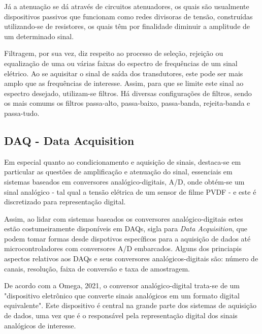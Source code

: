 \documentclass[
	12pt,				
	oneside,			
	a4paper,			
	english,			
	brazil,			
	]{abntex2ppgsi}
\begin{document}
Já a atenuação se dá através de circuitos atenuadores, os quais são usualmente dispositivos passivos que funcionam como redes divisoras de tensão, construídas utilizando-se de resistores, os quais têm por finalidade diminuir a amplitude de um determinado sinal.


Filtragem, por sua vez, diz respeito ao processo de seleção, rejeição ou equalização de uma ou várias faixas do espectro de frequências de um sinal elétrico. Ao se aquisitar o sinal de saída dos transdutores, este pode ser mais amplo que as frequências de interesse. Assim, para que se limite este sinal ao espectro desejado, utilizam-se filtros. Há diversas configurações de filtros, sendo os mais comums os filtros passa-alto, passa-baixo, passa-banda, rejeita-banda e passa-tudo. 


\subsection{\textbf{DAQ - Data Acquisition}}

Em especial quanto ao condicionamento e aquisição de sinais, destaca-se em particular as questões de amplificação e atenuação do sinal, essenciais em sistemas baseados em conversores analógico-digitais, A/D, onde obtém-se um sinal analógico - tal qual a tensão elétrica de um sensor de filme PVDF - e este é discretizado para representação digital. 

Assim, ao lidar com sistemas baseados os conversores analógico-digitais estes estão costumeiramente disponíveis em DAQs, sigla para \textit{Data Acquisition}, que podem tomar formas desde dispotivos específicos para a aquisição de dados até microcontroladores com conversores A/D embarcados. Alguns dos princiapis aspectos relativos aos DAQs e seus conversores analógicos-digitais são: número de canais, resolução, faixa de conversão e taxa de amostragem.

De acordo com a Omega, 2021, o conversor analógico-digital trata-se de um "dispositivo eletrônico que converte sinais analógicos em um formato digital equivalente". Este dispositivo é central na grande parte dos sistemas de aquisição de dados, uma vez que é o responsável pela representação digital dos sinais analógicos de interesse. 

\end{document}
